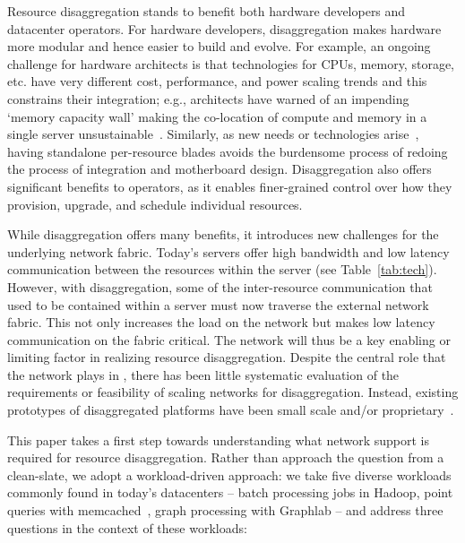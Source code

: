 Resource disaggregation stands to benefit both hardware developers and datacenter operators. %
For hardware developers, disaggregation makes hardware more modular and hence 
easier to build and evolve. 
For example, an ongoing challenge for hardware architects is that technologies for CPUs, memory, storage, etc. have very different cost, performance, and power scaling trends and this constrains their integration; e.g., architects have warned of an impending `memory capacity wall' making the co-location of compute and memory in a single server unsustainable~\cite{ddcHwDesign1}. 
Similarly, as new needs or technologies arise~\cite{memristors,nvram,reg-ex-hardware,gpus}, having standalone per-resource blades avoids the burdensome process of redoing the process of integration and motherboard design.
Disaggregation also offers significant benefits to operators, as it enables finer-grained control over how they  provision, upgrade, and schedule individual resources.

While disaggregation offers many benefits, it introduces new challenges for the underlying network fabric. Today's servers offer high bandwidth and low latency communication between the resources within the server (see Table~\ref{tab:tech}). However, with disaggregation, some of the inter-resource communication that used to be contained within a server must now traverse the external network fabric. This not only increases the load on the network but makes low latency communication on the fabric critical. The network will thus be a key enabling or limiting factor in realizing resource disaggregation. 
Despite the central role that the network plays in \dis, there has been little systematic evaluation of the requirements or feasibility of scaling networks for disaggregation. Instead, existing prototypes of disaggregated platforms have been small scale and/or proprietary~\cite{rsa, hptm, fdr, seamicro}. 

This paper takes a first step towards understanding what network support is required for resource disaggregation. Rather than approach the question from a clean-slate, we adopt a workload-driven approach: we take five diverse workloads commonly found in today's datacenters -- batch processing jobs in Hadoop, point queries with memcached~\cite{memcached}, graph processing with Graphlab -- and address three questions in the context of these workloads: 

